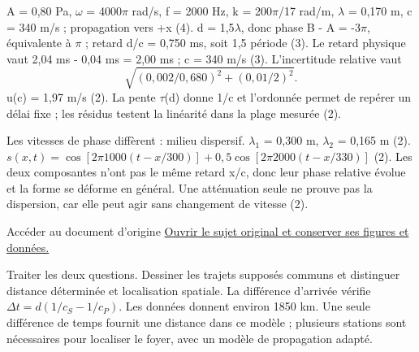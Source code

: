 A = 0,80 Pa, \ensuremath{\omega} = 4000\ensuremath{\pi} rad/s, f = 2000 Hz, k = 200\ensuremath{\pi}/17 rad/m, \ensuremath{\lambda} = 0,170 m, c = 340 m/s ; propagation vers +x (4). d = 1,5\ensuremath{\lambda}, donc phase B - A = -3\ensuremath{\pi}, équivalente à \ensuremath{\pi} ; retard d/c = 0,750 ms, soit 1,5 période (3).
Le retard physique vaut 2,04 ms - 0,04 ms = 2,00 ms ; c = 340 m/s (3). L’incertitude relative vaut \[\sqrt{(0{,}002/0{,}680)^2+(0{,}01/2)^2}.\]u(c) = 1,97 m/s (2). La pente \ensuremath{\tau}(d) donne 1/c et l’ordonnée permet de repérer un délai fixe ; les résidus testent la linéarité dans la plage mesurée (2).


Les vitesses de phase diffèrent : milieu dispersif. \ensuremath{\lambda_1} = 0,300 m, \ensuremath{\lambda_2} = 0,165 m (2). $s(x,t)=\cos[2\pi1000(t-x/300)]+0{,}5\cos[2\pi2000(t-x/330)]$ (2). Les deux composantes n’ont pas le même retard x/c, donc leur phase relative évolue et la forme se déforme en général. Une atténuation seule ne prouve pas la dispersion, car elle peut agir sans changement de vitesse (2).


\begin{loi}{Accéder au document d’origine}
\href{https://mpsi.schleck.ovh/fichiers/td/td9_ondes.pdf}{Ouvrir le sujet original et conserver ses figures et données.}
\end{loi}
Traiter les deux questions. Dessiner les trajets supposés communs et distinguer distance déterminée et localisation spatiale.
La différence d’arrivée vérifie $\Delta t=d(1/c_S-1/c_P)$. Les données donnent environ 1850 km. Une seule différence de temps fournit une distance dans ce modèle ; plusieurs stations sont nécessaires pour localiser le foyer, avec un modèle de propagation adapté.

